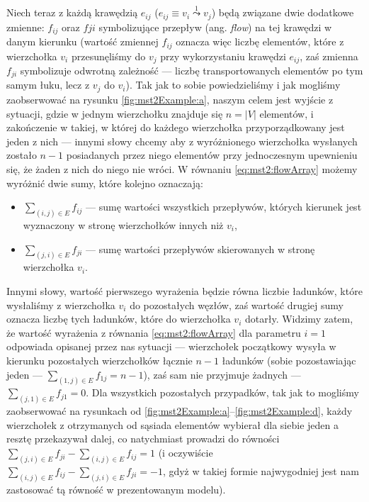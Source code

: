 Niech teraz z każdą krawędzią $e_{ij}$ ($e_{ij} \equiv v_{i} \overset{1}{\leadsto} v_{j}$) będą związane dwie dodatkowe zmienne: $f_{ij}$ oraz $f{ji}$ symbolizujące przepływ (ang. \textit{flow}) na tej krawędzi w danym kierunku (wartość zmiennej $f_{ij}$ oznacza więc liczbę elementów, które z wierzchołka $v_{i}$ przesunęliśmy do $v_{j}$ przy wykorzystaniu krawędzi $e_{ij}$, zaś zmienna $f_{ji}$ symbolizuje odwrotną zależność --- liczbę transportowanych elementów po tym samym łuku, lecz z $v_{j}$ do $v_{i}$). Tak jak to sobie powiedzieliśmy i jak mogliśmy zaobserwować na rysunku \ref{fig:mst2Example:a}, naszym celem jest wyjście z sytuacji, gdzie w jednym wierzchołku znajduje się $n = \left| V \right|$ elementów, i zakończenie w takiej, w której do każdego wierzchołka przyporządkowany jest jeden z nich --- innymi słowy chcemy aby z wyróżnionego wierzchołka wysłanych zostało $n - 1$ posiadanych przez niego elementów przy jednoczesnym upewnieniu się, że żaden z nich do niego nie wróci. W równaniu \ref{eq:mst2:flowArray} możemy wyróżnić dwie sumy, które kolejno oznaczają:

\begin{itemize}
	\item $\sum_{ \left( i, j \right ) \in E } f_{ij}$ --- sumę wartości wszystkich przepływów, których kierunek jest wyznaczony w stronę wierzchołków innych niż $v_{i}$,
	\item $\sum_{ \left( j, i \right ) \in E } f_{ji}$ --- sumę wartości przepływów skierowanych w stronę wierzchołka $v_{i}$.
\end{itemize}

Innymi słowy, wartość pierwszego wyrażenia będzie równa liczbie ładunków, które wysłaliśmy z wierzchołka $v_{i}$ do pozostałych węzłów, zaś wartość drugiej sumy oznacza liczbę tych ładunków, które do wierzchołka $v_{i}$ dotarły. Widzimy zatem, że wartość wyrażenia z równania \ref{eq:mst2:flowArray} dla parametru $i = 1$ odpowiada opisanej przez nas sytuacji --- wierzchołek początkowy wysyła w kierunku pozostałych wierzchołków łącznie $n - 1$ ładunków (sobie pozostawiając jeden --- $\sum_{ \left( 1, j \right ) \in E } f_{1j} = n - 1$), zaś sam nie przyjmuje żadnych --- $\sum_{ \left( j, 1 \right ) \in E } f_{j1} = 0$. Dla wszystkich pozostałych przypadków, tak jak to mogliśmy zaobserwować na rysunkach od \ref{fig:mst2Example:a}--\ref{fig:mst2Example:d}, każdy wierzchołek z otrzymanych od sąsiada elementów wybierał dla siebie jeden a resztę przekazywał dalej, co natychmiast prowadzi do równości $\sum_{ \left( j, i \right ) \in E } f_{ji} - \sum_{ \left( i, j \right ) \in E } f_{ij} = 1$ (i oczywiście $\sum_{ \left( i, j \right ) \in E } f_{ij} - \sum_{ \left( j, i \right ) \in E } f_{ji} = -1$, gdyż w takiej formie najwygodniej jest nam zastosować tą równość w prezentowanym modelu).

